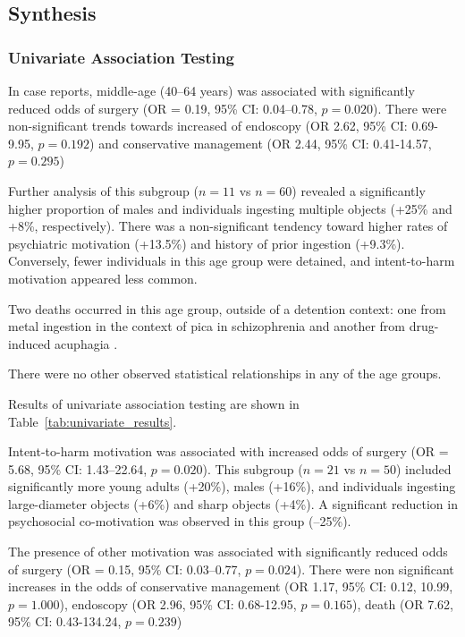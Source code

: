 \subsection{Synthesis}

\subsubsection{Univariate Association Testing}

In case reports, middle-age (40--64 years) was associated with significantly reduced odds of surgery (OR = 0.19, 95\% CI: 0.04--0.78, $p = 0.020$). There were non-significant trends towards increased of endoscopy (OR 2.62, 95\% CI: 0.69-9.95, $p = 0.192$) and conservative management (OR 2.44, 95\% CI: 0.41-14.57, $p = 0.295$)

Further analysis of this subgroup ($n = 11$ vs $n = 60$) revealed a significantly higher proportion of males and individuals ingesting multiple objects (+25\% and +8\%, respectively). There was a non-significant tendency toward higher rates of psychiatric motivation (+13.5\%) and history of prior ingestion (+9.3\%). Conversely, fewer individuals in this age group were detained, and intent-to-harm motivation appeared less common. 

Two deaths occurred in this age group, outside of a detention context: one from metal ingestion in the context of pica in schizophrenia \cite{Kumar_2001} and another from drug-induced acuphagia \cite{Emamhadi_2018}. 

There were no other observed statistical relationships in any of the age groups. 

Results of univariate association testing are shown in Table~\ref{tab:univariate_results}.



Intent-to-harm motivation was associated with increased odds of surgery (OR = 5.68, 95\% CI: 1.43--22.64, $p = 0.020$). This subgroup ($n = 21$ vs $n = 50$) included significantly more young adults (+20\%), males (+16\%), and individuals ingesting large-diameter objects (+6\%) and sharp objects (+4\%). A significant reduction in psychosocial co-motivation was observed in this group (–25\%).

The presence of other motivation was associated with significantly reduced odds of surgery (OR = 0.15, 95\% CI: 0.03--0.77, $p = 0.024$). There were non significant increases in the odds of conservative management (OR 1.17, 95\% CI: 0.12, 10.99, $p = 1.000$), endoscopy (OR 2.96, 95\% CI: 0.68-12.95, $p = 0.165$), death (OR 7.62, 95\% CI: 0.43-134.24, $p =0.239$)


